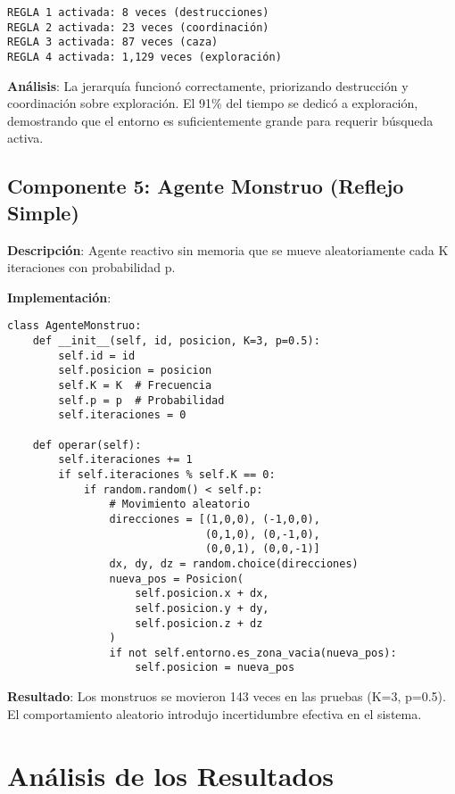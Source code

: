 \documentclass[10pt,twocolumn]{article}
\begin{document}
\begin{verbatim}
REGLA 1 activada: 8 veces (destrucciones)
REGLA 2 activada: 23 veces (coordinación)
REGLA 3 activada: 87 veces (caza)
REGLA 4 activada: 1,129 veces (exploración)
\end{verbatim}

\textbf{Análisis}: La jerarquía funcionó correctamente, priorizando destrucción y coordinación sobre exploración. El 91\% del tiempo se dedicó a exploración, demostrando que el entorno es suficientemente grande para requerir búsqueda activa.

\subsection{Componente 5: Agente Monstruo (Reflejo Simple)}

\textbf{Descripción}: Agente reactivo sin memoria que se mueve aleatoriamente cada K iteraciones con probabilidad p.

\textbf{Implementación}:

\begin{lstlisting}[caption=Agente Monstruo]
class AgenteMonstruo:
    def __init__(self, id, posicion, K=3, p=0.5):
        self.id = id
        self.posicion = posicion
        self.K = K  # Frecuencia
        self.p = p  # Probabilidad
        self.iteraciones = 0
    
    def operar(self):
        self.iteraciones += 1
        if self.iteraciones % self.K == 0:
            if random.random() < self.p:
                # Movimiento aleatorio
                direcciones = [(1,0,0), (-1,0,0), 
                               (0,1,0), (0,-1,0),
                               (0,0,1), (0,0,-1)]
                dx, dy, dz = random.choice(direcciones)
                nueva_pos = Posicion(
                    self.posicion.x + dx,
                    self.posicion.y + dy,
                    self.posicion.z + dz
                )
                if not self.entorno.es_zona_vacia(nueva_pos):
                    self.posicion = nueva_pos
\end{lstlisting}

\textbf{Resultado}: Los monstruos se movieron 143 veces en las pruebas (K=3, p=0.5). El comportamiento aleatorio introdujo incertidumbre efectiva en el sistema.

\section{Análisis de los Resultados}
\end{document}
